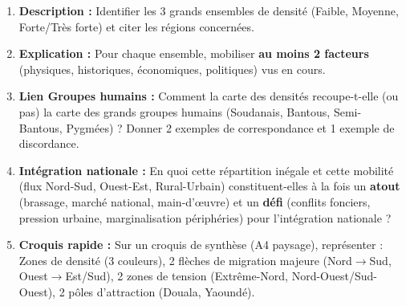\documentclass[11pt]{article}
\begin{document}
\begin{exercice}
\begin{enumerate}
    \item \textbf{Description :} Identifier les 3 grands ensembles de densité (Faible, Moyenne, Forte/Très forte) et citer les régions concernées.
    \item \textbf{Explication :} Pour chaque ensemble, mobiliser \textbf{au moins 2 facteurs} (physiques, historiques, économiques, politiques) vus en cours.
    \item \textbf{Lien Groupes humains :} Comment la carte des densités recoupe-t-elle (ou pas) la carte des grands groupes humains (Soudanais, Bantous, Semi-Bantous, Pygmées) ? Donner 2 exemples de correspondance et 1 exemple de discordance.
    \item \textbf{Intégration nationale :} En quoi cette répartition inégale et cette mobilité (flux Nord-Sud, Ouest-Est, Rural-Urbain) constituent-elles à la fois un \textbf{atout} (brassage, marché national, main-d'œuvre) et un \textbf{défi} (conflits fonciers, pression urbaine, marginalisation périphéries) pour l'intégration nationale ?
    \item \textbf{Croquis rapide :} Sur un croquis de synthèse (A4 paysage), représenter : Zones de densité (3 couleurs), 2 flèches de migration majeure (Nord$\rightarrow$Sud, Ouest$\rightarrow$Est/Sud), 2 zones de tension (Extrême-Nord, Nord-Ouest/Sud-Ouest), 2 pôles d'attraction (Douala, Yaoundé).
\end{enumerate}
\end{exercice}
\end{document}
